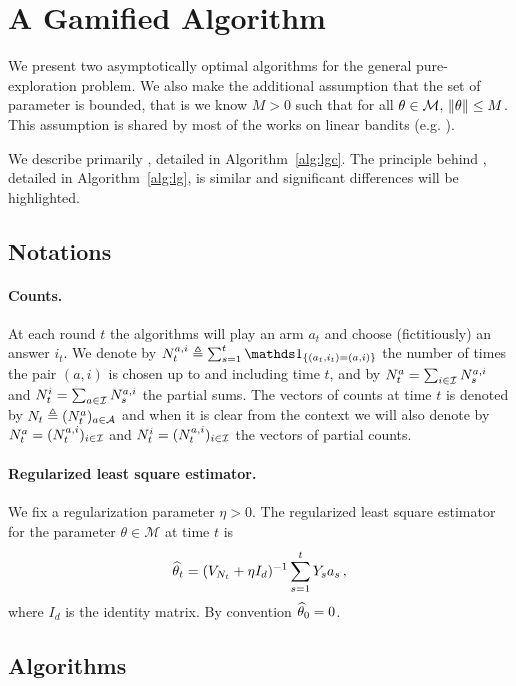 \section{A Gamified Algorithm}\label{sec:lgc.game}

We present two asymptotically optimal algorithms for the general pure-exploration problem. We also make the additional assumption that the set of parameter is bounded, that is we know $M>0$ such that for all $\theta\in\mathcal{M},\, \left\lVert\theta\right\rVert\leq M$. This assumption is shared by most of the works on %
linear bandits (e.g. \citealt{abbasi-yadkori2011linear, soare2014linear}).

We describe primarily \LGC, detailed in Algorithm~\ref{alg:lgc}. The principle behind \LG, detailed in Algorithm~\ref{alg:lg}, is similar and significant differences will be highlighted.


\subsection{Notations}
\paragraph{Counts.} At each round $t$ the algorithms will play an arm $a_t$ and choose (fictitiously) an answer $i_t$. We denote by $N_t^{a,i} \eqdef\sum_{s=1}^t \ind_{\{(a_t,i_t)=(a,i)\}}$ the number of times the pair $(a,i)$ is chosen up to and including time $t$, and by $N_t^a =\sum_{i\in\mathcal{I}} N_s^{a,i}$ and $N_t^i =\sum_{a\in\mathcal{I}} N_s^{a,i}$ the partial sums. The vectors of counts at time $t$ is denoted by $N_t \triangleq (N_t^a)_{a\in\mathcal{A}}$
and when it is clear from the context we will also denote by $N_t^a = (N_t^{a,i})_{i\in\mathcal{I}}$ and $N_t^i = (N_t^{a,i})_{i\in\mathcal{I}}$ the vectors of partial counts.

\paragraph{Regularized least square estimator.} We fix a regularization parameter $\eta > 0$. The regularized least square estimator for the parameter $\theta\in \mathcal M$ at time $t$ is
\[
\widehat{\theta}_{t} = (V_{N_t} + \eta I_d)^{-1} \sum_{s=1}^t Y_s a_s\,,
\]
where $I_d$ is the identity matrix. By convention $\widehat{\theta}_0 = 0$.


\subsection{Algorithms}

